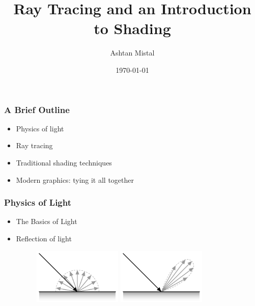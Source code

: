 \documentclass[12pt]{beamer}
\title{Ray Tracing and an Introduction to Shading}
\author{Ashtan Mistal}
\date{\today}
\begin{document}
  \begin{frame}
    \titlepage
  \end{frame}

  \begin{frame}
    \frametitle{A Brief Outline}
    \begin{itemize}
      \item Physics of light
      \item Ray tracing
      \item Traditional shading techniques
      \item Modern graphics: tying it all together
    \end{itemize}
  \end{frame}

  \begin{frame}
    \frametitle{Physics of Light}
    \begin{itemize}
      \item The Basics of Light
      \item Reflection of light %
      \begin{figure}
        \includegraphics[width=0.4\textwidth]{diffuse}
        \includegraphics[width=0.4\textwidth]{specular}

\end{figure}
\end{itemize}
\end{frame}
\end{document}
